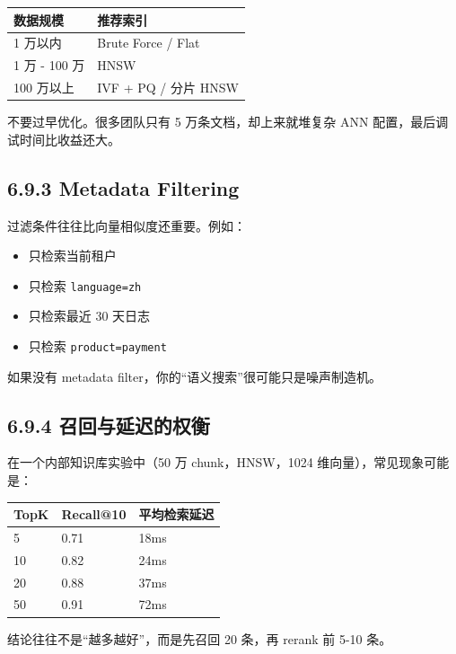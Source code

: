\begingroup
\scriptsize
\setlength{\tabcolsep}{3pt}
\begin{longtable}{|p{}|p{}|}
\hline
数据规模 & 推荐索引 \\ \hline
1 万以内 & Brute Force / Flat \\ \hline
1 万 - 100 万 & HNSW \\ \hline
100 万以上 & IVF + PQ / 分片 HNSW \\ \hline
\end{longtable}
\endgroup

不要过早优化。很多团队只有 5 万条文档，却上来就堆复杂 ANN 配置，最后调试时间比收益还大。


\subsection{6.9.3 Metadata Filtering}

过滤条件往往比向量相似度还重要。例如：


\begin{itemize}[leftmargin=2em]
\item 只检索当前租户
\item 只检索 \texttt{language=zh}
\item 只检索最近 30 天日志
\item 只检索 \texttt{product=payment}
\end{itemize}

如果没有 metadata filter，你的``语义搜索''很可能只是噪声制造机。


\subsection{6.9.4 召回与延迟的权衡}

在一个内部知识库实验中（50 万 chunk，HNSW，1024 维向量），常见现象可能是：


\begingroup
\scriptsize
\setlength{\tabcolsep}{3pt}
\begin{longtable}{|p{}|p{}|p{}|}
\hline
TopK & Recall@10 & 平均检索延迟 \\ \hline
5 & 0.71 & 18ms \\ \hline
10 & 0.82 & 24ms \\ \hline
20 & 0.88 & 37ms \\ \hline
50 & 0.91 & 72ms \\ \hline
\end{longtable}
\endgroup

结论往往不是``越多越好''，而是先召回 20 条，再 rerank 前 5-10 条。


